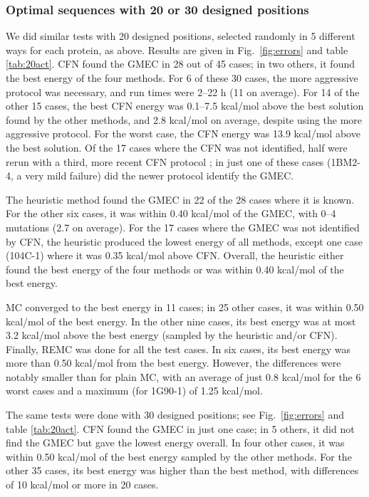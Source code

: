 \subsubsection{Optimal sequences with 20 or 30 designed positions}
We did similar tests with 20 designed positions, selected randomly in 5 different ways for each protein, as above.
Results are given in Fig.\ \ref{fig:errors} and table \ref{tab:20act}. CFN found the GMEC in 28 out of 45 cases;
in two others, it found the best energy of the four methods. For 6 of these 30 cases, the more aggressive protocol was necessary, and run times were 2--22 h (11 on average). For 14 of the other 15 cases, the best CFN energy was 0.1--7.5 kcal/mol above the best solution found by the other methods, and 2.8 kcal/mol on average, despite using the more aggressive protocol. For the worst case, the CFN energy was 13.9 kcal/mol above the best solution. Of the 17 cases where the CFN was not identified, half were rerun with a third, more recent CFN protocol \cite{Simoncini15}; in just one of these cases (1BM2-4, a very mild failure) did the newer protocol identify the GMEC.

The heuristic method found the GMEC in 22 of the 28 cases where it is known. For the other six cases, it was within 0.40 kcal/mol of the GMEC, with 0--4 mutations (2.7 on average). For the 17 cases where the GMEC was not identified by CFN, the heuristic produced the lowest energy of all methods, except one case (104C-1) where it was 0.35 kcal/mol above CFN.
Overall, the heuristic either found the best energy of the four methods or was within 0.40 kcal/mol of the best energy.

MC converged to the best energy in 11 cases; in 25 other cases, it was within 0.50 kcal/mol of the best energy. In the other nine cases, its best energy was at most 3.2 kcal/mol above the best energy (sampled by the heuristic and/or CFN).
Finally, REMC was done for all the test cases. In six cases, its best energy was more than 0.50 kcal/mol from the best energy. However, the differences were notably smaller than for plain MC, with an average of just 0.8 kcal/mol for the 6 worst cases and a maximum (for 1G90-1) of 1.25 kcal/mol.

The same tests were done with 30 designed positions; see Fig.\ \ref{fig:errors} and table \ref{tab:20act}. CFN found the GMEC in just one case; in 5 others, it did not find the GMEC but gave the lowest energy overall. In four other cases, it was within 0.50 kcal/mol of the best energy sampled by the other methods. For the other 35 cases, its best energy was higher than the best method, with differences of 10 kcal/mol or more in 20 cases.


